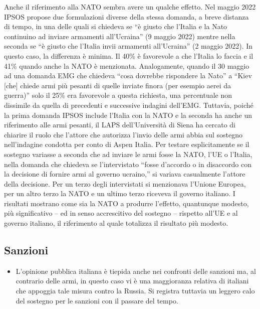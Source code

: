 \documentclass[
]{book}
\providecommand{\tightlist}{%
  \setlength{\itemsep}{0pt}\setlength{\parskip}{0pt}}
\begin{document}
Anche il riferimento alla NATO sembra avere un qualche effetto. Nel maggio 2022 IPSOS propose due formulazioni diverse della stessa domanda, a breve distanza di tempo, in una delle quali si chiedeva se ``è giusto che l'Italia e la Nato continuino ad inviare armamenti all'Ucraina'' (9 maggio 2022) mentre nella seconda se ``è giusto che l'Italia invii armamenti all'Ucraina'' (2 maggio 2022). In questo caso, la differenza è minima. Il 40\% è favorevole a che l'Italia lo faccia e il 41\% quando anche la NATO è menzionata. Analogamente, quando il 30 maggio ad una domanda EMG che chiedeva ``cosa dovrebbe rispondere la Nato'' a ``Kiev {[}che{]} chiede armi più pesanti di quelle inviate finora (per esempio aerei da guerra)'' solo il 25\% era favorevole a questa richiesta, una percentuale non dissimile da quella di precedenti e successive indagini dell'EMG. Tuttavia, poiché la prima domanda IPSOS include l'Italia con la NATO e la seconda ha anche un riferimento alle armi pesanti, il LAPS dell'Università di Siena ha cercato di chiarire il ruolo che l'attore che autorizza l'invio delle armi abbia sul sostegno nell'indagine condotta per conto di Aspen Italia. Per testare esplicitamente se il sostegno variasse a seconda che ad inviare le armi fosse la NATO, l'UE o l'Italia, nella domanda che chiedeva se l'intervistato ``fosse d'accordo o in disaccordo con la decisione di fornire armi al governo ucraino,'' si variava casualmente l'attore della decisione. Per un terzo degli intervistati si menzionava l'Unione Europea, per un altro terzo la NATO e un ultimo terzo riceveva il governo italiano. I risultati mostrano come sia la NATO a produrre l'effetto, quantunque modesto, più significativo -- ed in senso accrescitivo del sostegno -- rispetto all'UE e al governo italiano, il riferimento al quale totalizza il risultato più modesto.

\hypertarget{sanzioni}{%
\subsection{Sanzioni}\label{sanzioni}}

\begin{itemize}
\tightlist
\item
  L'opinione pubblica italiana è tiepida anche nei confronti delle sanzioni ma, al contrario delle armi, in questo caso vi è una maggioranza relativa di italiani che appoggia tale misura contro la Russia. Si registra tuttavia un leggero calo del sostegno per le sanzioni con il passare del tempo.
\end{itemize}
\end{document}
